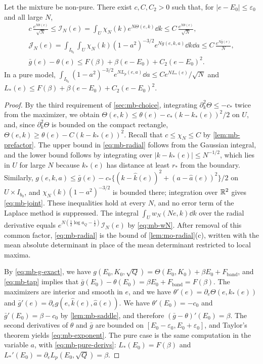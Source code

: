 \begin{lemma}\label{lem:mb-laplace}
Let the mixture be non-pure. There exist $c,C,C_2>0$ such that, for $|e-E_0|\le\varepsilon_0$ and all large $N$,
\begin{gather}
c\,\frac{e^{N\theta(e)}}{\sqrt N}\le\mathcal I_N(e)=\int_U\chi_N(k)e^{N\Theta(e,k)}\dd k\le C\,\frac{e^{N\theta(e)}}{\sqrt N},\label{eq:mb-radial}\\
\mathcal J_N(e)=\int_{I_{b_0}}\int_U\chi_N(k)(1-a^2)^{-3/2}e^{Ng(e,k,a)}\dd k\dd a\le C\,\frac{e^{N\bar g(e)}}N,\label{eq:mb-joint}\\
\bar g(e)-\theta(e)\le F(\beta)+\beta(e-E_0)+C_2(e-E_0)^2 .\label{eq:mb-exponent}
\end{gather}
In a pure model, $\int_{I_{b_0}}(1-a^2)^{-3/2}e^{NL_p(e,a)}\dd a\le Ce^{NL_*(e)}/\sqrt N$ and $L_*(e)\le F(\beta)+\beta(e-E_0)+C_2(e-E_0)^2$.
\end{lemma}

\begin{proof}
By the third requirement of \cref{sec:mb-choice}, integrating $\partial_k^2\Theta\le-c_*$ twice from the maximizer, we obtain $\Theta(e,k)\le\theta(e)-c_*(k-k_*(e))^2/2$ on $U$, and, since $\partial_k^2\Theta$ is bounded on the compact rectangle, $\Theta(e,k)\ge\theta(e)-C(k-k_*(e))^2$. Recall that $c\le\chi_N\le C$ by \cref{lem:mb-prefactor}. The upper bound in \eqref{eq:mb-radial} follows from the Gaussian integral, and the lower bound follows by integrating over $|k-k_*(e)|\le N^{-1/2}$, which lies in $U$ for large $N$ because $k_*(e)$ has distance at least $r_*$ from the boundary. Similarly, $g(e,k,a)\le\bar g(e)-c_*\{(k-\widehat k(e))^2+(a-\widehat a(e))^2\}/2$ on $U\times I_{b_0}$, and $\chi_N(k)(1-a^2)^{-3/2}$ is bounded there; integration over $\mathbb R^2$ gives \eqref{eq:mb-joint}. These inequalities hold at every $N$, and no error term of the Laplace method is suppressed. The integral $\int_Uw_N(Ne,k)\dd k$ over the radial derivative equals $e^{N(\frac12\log a_Q-\frac12)}\mathcal I_N(e)$ by \eqref{eq:mb-wN}. After removal of this common factor, \eqref{eq:mb-radial} is the bound of \cref{lem:mo-radial}(c), written with the mean absolute determinant in place of the mean determinant restricted to local maxima.

By \eqref{eq:mb-g-exact}, we have $g(E_0,K_0,\sqrt Q)=\Theta(E_0,K_0)+\beta E_0+F_{\mathrm{band}}$, and \eqref{eq:mb-tap} implies that $\bar g(E_0)-\theta(E_0)=\beta E_0+F_{\mathrm{band}}=F(\beta)$. The maximizers are interior and smooth in $e$, and we have $\theta'(e)=\partial_e\Theta(e,k_*(e))$ and $\bar g'(e)=\partial_eg(e,\widehat k(e),\widehat a(e))$. We have $\theta'(E_0)=-c_0$ and $\bar g'(E_0)=\beta-c_0$ by \cref{lem:mb-saddle}, and therefore $(\bar g-\theta)'(E_0)=\beta$. The second derivatives of $\theta$ and $\bar g$ are bounded on $[E_0-\varepsilon_0,E_0+\varepsilon_0]$, and Taylor's theorem yields \eqref{eq:mb-exponent}. The pure case is the same computation in the variable $a$, with \eqref{eq:mb-pure-derivs}: $L_*(E_0)=F(\beta)$ and $L_*'(E_0)=\partial_eL_p(E_0,\sqrt Q)=\beta$.
\end{proof}

